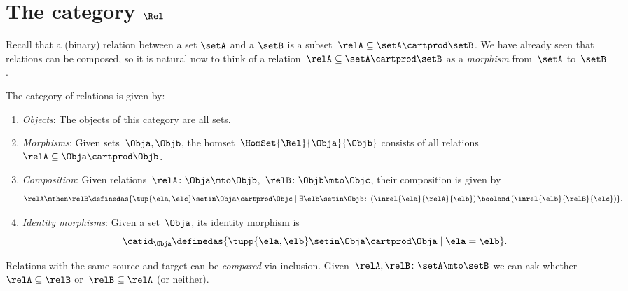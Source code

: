 
\section[The category $\Rel$]{The category $\Rel$}
\label{sec:cat-of-relations}



Recall that a (binary) relation between a set $\setA$ and a $\setB$ is a subset~$\relA \subseteq \setA \cartprod \setB$.
We have already seen that relations can be composed, so it is natural now to think of a relation~$\relA \subseteq \setA \cartprod \setB$ as a \emph{morphism} from~$\setA$ to~$\setB$.

\begin{ctdefinition}
    \label{def:Rel}
    The category of relations \iindex{\Rel}  is given by:
    \begin{enumerate}
        \item \emph{Objects}: The objects of this category are all sets.
        \item \emph{Morphisms}: Given sets~$\Obja, \Objb$, the homset~$\HomSet{\Rel}{\Obja}{\Objb}$ consists of all relations~$\relA\subseteq \Obja\cartprod \Objb$.
        \item \emph{Composition}: Given relations~$\relA \colon \Obja\mto \Objb$,~$\relB \colon \Objb\mto \Objc$, their composition is given by
              \begin{equation}
                  \label{eq:RelCompRule}
                  \relA \mthen \relB \definedas \{\tup{\ela,\elc} \setin \Obja \cartprod \Objc \mid  \exists \elb \setin \Objb \colon \left(\inrel{\ela}{\relA}{\elb} \right) \booland \left(\inrel{\elb}{\relB}{\elc}\right)\}.
              \end{equation}
        \item \emph{Identity morphisms}: Given a set~$\Obja$, its identity morphism is
              \begin{equation}
                  \catid_\Obja \definedas \{ \tupp{\ela,\elb} \setin \Obja \cartprod \Obja \mid  \ela = \elb \}.
              \end{equation}
    \end{enumerate}
\end{ctdefinition}

\begin{remark}
    Relations with the same source and target can be \emph{compared} via inclusion.
    Given~$\relA, \relB \colon \setA\mto \setB$  we can ask whether~$\relA\subseteq \relB$ or~$\relB\subseteq \relA$ (or neither).
\end{remark}

